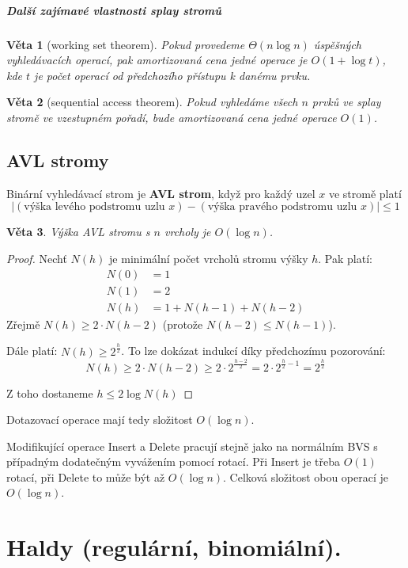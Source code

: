 \documentclass[11pt]{report} %
\newtheorem{theorem}{Věta}[section]
\numberwithin{equation}{section}
\begin{document}
\subparagraph{Další zajímavé vlastnosti splay stromů}
\begin{theorem}[working set theorem]
Pokud provedeme $\Theta(n\log n)$ úspěšných vyhledávacích operací, pak amortizovaná cena jedné operace je $O(1+\log t)$, kde $t$ je počet operací od předchozího přístupu k danému prvku.
\end{theorem}
\begin{theorem}[sequential access theorem]
Pokud vyhledáme všech $n$ prvků ve splay stromě ve vzestupném pořadí, bude amortizovaná cena jedné operace $O(1)$.
\end{theorem}



\subsection{AVL stromy}
Binární vyhledávací strom je \textbf{AVL strom}, když pro každý uzel $x$ ve stromě platí 
$$|(\text{výška levého podstromu uzlu $x$}) - (\text{výška pravého podstromu uzlu $x$})| \leq 1$$

\begin{theorem}
Výška AVL stromu s $n$ vrcholy je $O(\log n)$.
\end{theorem}
\begin{proof}
Nechť $N(h)$ je minimální počet vrcholů stromu výšky $h$. Pak platí:
\begin{align*}
	N(0) &= 1 \\
	N(1) &= 2 \\
	N(h) &= 1 + N(h - 1) + N(h - 2)
\end{align*}
Zřejmě $N(h) \geq 2\cdot N(h-2)$ (protože $N(h-2) \leq N(h-1)$). 

Dále platí: $N(h) \geq 2^{\frac{h}{2}}$. To lze dokázat indukcí díky předchozímu pozorování:
$$N(h) \geq 2\cdot N(h-2) \geq 2\cdot 2^{\frac{h-2}{2}} = 2\cdot 2^{\frac{h}{2} - 1} = 2^\frac{h}{2}$$

Z toho dostaneme $h \leq 2 \log N(h)$
\end{proof}

Dotazovací operace mají tedy složitost $O(\log n)$.

Modifikující operace Insert a Delete pracují stejně jako na normálním BVS s případným dodatečným vyvážením pomocí rotací. Při Insert je třeba $O(1)$ rotací, při Delete to může být až $O(\log n)$. Celková složitost obou operací je $O(\log n)$.

\section{Haldy (regulární, binomiální).}
\end{document}
